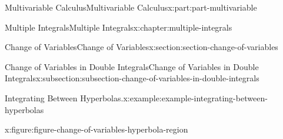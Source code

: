 \documentclass[twoside,10pt,]{book}
\numberwithin{equation}{part}
\begin{document}
\begin{partptx}{Multivariable Calculus}{}{Multivariable Calculus}{}{}{x:part:part-multivariable}
\begin{chapterptx}{Multiple Integrals}{}{Multiple Integrals}{}{}{x:chapter:multiple-integrals}
\begin{sectionptx}{Change of Variables}{}{Change of Variables}{}{}{x:section:section-change-of-variables}
\begin{subsectionptx}{Change of Variables in Double Integrals}{}{Change of Variables in Double Integrals}{}{}{x:subsection:subsection-change-of-variables-in-double-integrals}
\begin{example}{Integrating Between Hyperbolas.}{x:example:example-integrating-between-hyperbolas}
\begin{figureptx}{}{x:figure:figure-change-of-variables-hyperbola-region}{}
\begin{image}{0}{1}{0}%
\end{image}
\end{figureptx}
\end{example}
\end{subsectionptx}
\end{sectionptx}
\end{chapterptx}
\end{partptx}
\end{document}
